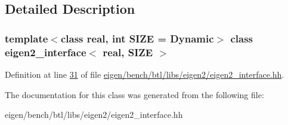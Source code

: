 \subsection{Detailed Description}
\subsubsection*{template$<$class real, int S\+I\+ZE = Dynamic$>$\newline
class eigen2\+\_\+interface$<$ real, S\+I\+Z\+E $>$}



Definition at line \hyperlink{eigen_2bench_2btl_2libs_2eigen2_2eigen2__interface_8hh_source_l00031}{31} of file \hyperlink{eigen_2bench_2btl_2libs_2eigen2_2eigen2__interface_8hh_source}{eigen/bench/btl/libs/eigen2/eigen2\+\_\+interface.\+hh}.



The documentation for this class was generated from the following file\+:\begin{DoxyCompactItemize}
\item 
eigen/bench/btl/libs/eigen2/eigen2\+\_\+interface.\+hh\end{DoxyCompactItemize}
